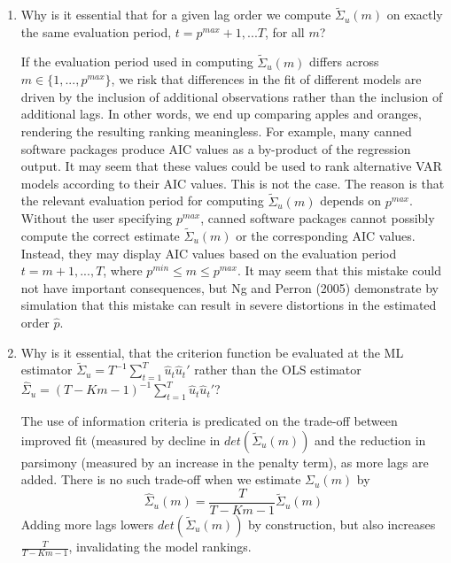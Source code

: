 \documentclass[a4paper]{scrartcl}
\begin{document}
    \begin{enumerate}
        \item Why is it essential that for a given lag order we compute $\tilde{\Sigma}_u(m)$ on exactly the same evaluation period, $t=p^{max}+1,...T$, for all $m$?
              \begin{solution}
                  If the evaluation period used in computing $\tilde{\Sigma}_u(m)$ differs across $m \in \{1,...,p^{max}\}$, we risk that differences in the fit of different models are driven by the inclusion of additional observations rather than the inclusion of additional lags. In other words, we end up comparing apples and oranges, rendering the resulting ranking meaningless. For example, many canned software packages produce AIC values as a by-product of the regression output. It may seem that these values could be used to rank alternative VAR models according to their AIC values. This is not the case. The reason is that the relevant evaluation period for computing $\tilde{\Sigma}_u(m)$ depends on $p^{max}$. Without the user specifying $p^{max}$, canned software packages cannot possibly compute the correct estimate $\tilde{\Sigma}_u(m)$ or the corresponding AIC values. Instead, they may display AIC values based on the evaluation period $t = m + 1,..., T$, where $p^{min} \leq m \leq p^{max}$. It may seem that this mistake could not have important consequences, but Ng and Perron (2005) demonstrate by simulation that this mistake can result in severe distortions in the estimated order $\hat{p}$.
              \end{solution}
        \item Why is it essential, that the criterion function be evaluated at the ML estimator $\tilde{\Sigma}_u=T^{-1}\sum_{t=1}^T \hat{u}_t\hat{u}_t'$ rather than the OLS estimator $\hat{\Sigma}_u=(T-Km-1)^{-1}\sum_{t=1}^T \hat{u}_t\hat{u}_t'$?
              \begin{solution}
                  The use of information criteria is predicated on the trade-off between improved fit (measured by decline in $det(\tilde{\Sigma}_u(m))$ and the reduction in parsimony (measured by an increase in the penalty term), as more lags are added. There is no such trade-off when we estimate $\Sigma_u(m)$ by 
                  $$\hat{\Sigma}_u(m) = \frac{T}{T-Km-1}\tilde{\Sigma}_u(m)$$
                  Adding more lags lowers	$det(\tilde{\Sigma}_u(m))$ by construction, but also increases $\frac{T}{T-Km-1}$, invalidating the model rankings.
              \end{solution}

\end{enumerate}
\end{document}
